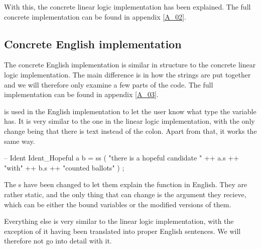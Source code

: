 With this, the concrete linear logic implementation has been explained. The full concrete implementation can be found in appendix \ref{A_02}.

\subsection{Concrete English implementation}
\label{04_02_02}

The concrete English implementation is similar in structure to the concrete linear logic implementation. The main difference is in how the strings are put together and we will therefore only examine a few parts of the code. The full implementation can be found in appendix \ref{A_03}.


 is used in the English implementation to let the user know what type the variable has. It is very similar to the one in the linear logic implementation, with the only change being that there is text instead of the colon. Apart from that, it works the same way.

\begin{lstgf}
        -- Ident
        Ident_Hopeful a b
            = ss ( "there is a hopeful candidate " ++ a.s ++ "with" ++ b.s ++ "counted ballots" ) ;
\end{lstgf}

The s have been changed to let them explain the function in English. They are rather static, and the only thing that can change is the argument they recieve, which can be either the bound variables or the modified versions of them.

Everything else is very similar to the linear logic implementation, with the exception of it having been translated into proper English sentences. We will therefore not go into detail with it.

